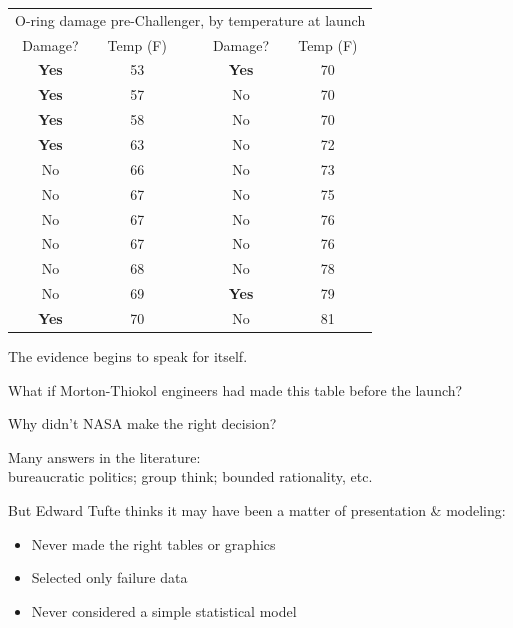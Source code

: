 \documentclass[pdflatex,landscape,titlepage]{foils}
\begin{document}
\begin{center}
\begin{tabular}{ccccc}
\toprule
\multicolumn{5}{c}{O-ring damage pre-Challenger, by temperature at launch}\\
Damage? &       Temp (F)        &       &       Damage? &       Temp (F)        \\
\midrule
 \textbf{Yes}        &        53  & \quad\quad\quad&  \textbf{Yes}     &       70   \\
 \textbf{Yes}        &       57   &       &       No       &       70      \\
 \textbf{Yes}        &       58   &       &       No       &       70      \\
 \textbf{Yes}        &       63   &       &       No       &       72      \\
No       &       66      &       &       No       &       73      \\
No       &       67      &       &       No       &       75      \\
No       &       67      &       &       No       &       76      \\
No       &       67      &       &       No       &       76      \\
No       &       68      &       &       No       &       78      \\
No       &       69      &       &        \textbf{Yes}        &       79   \\
 \textbf{Yes}        &       70   &       &       No       &       81      \\
\bottomrule
\end{tabular}
\end{center}

The evidence begins to speak for itself.

What if Morton-Thiokol engineers had made this table before the launch?


Why didn't NASA make the right decision?

Many answers in the literature:  \\
bureaucratic politics; group think; bounded rationality, etc.

But Edward Tufte thinks it may have been a matter of presentation \& modeling:

\begin{itemize}
\item Never made the right tables or graphics

\item Selected only failure data

\item Never considered a simple statistical model

\end{itemize}
\end{document}
